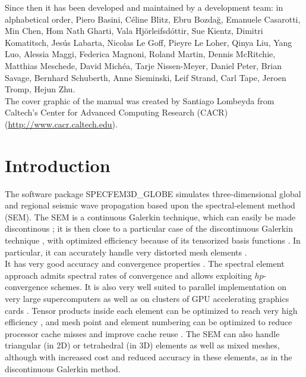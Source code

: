 \documentclass[oneside,english]{book}
\newcommand{\urlwithparentheses}[1]{(\url{#1})}
\newcommand{\toall}[1]{\textbf{*** All: #1 ***}}
\begin{document}
Since then it has been developed and maintained by a development team: in alphabetical order,
Piero Basini,
C\'eline Blitz,
Ebru Bozda\u{g},
Emanuele Casarotti,
Min Chen,
Hom Nath Gharti,
Vala Hj\"orleifsd\'ottir,
Sue Kientz,
Dimitri Komatitsch,
Jes\'us Labarta,
Nicolas Le Goff,
Pieyre Le Loher,
Qinya Liu,
Yang Luo,
Alessia Maggi,
Federica Magnoni,
Roland Martin,
Dennis McRitchie,
Matthias Meschede,
David Mich\'ea,
Tarje Nissen-Meyer,
Daniel Peter,
Brian Savage,
Bernhard Schuberth,
Anne Sieminski,
Leif Strand,
Carl Tape,
Jeroen Tromp,
Hejun Zhu.\\

The cover graphic of the manual was created
by Santiago Lombeyda from Caltech's Center for Advanced Computing Research (CACR) \urlwithparentheses{http://www.cacr.caltech.edu}.\\

\newpage{}

\tableofcontents{}

\chapter{Introduction}

The software package SPECFEM3D\_GLOBE simulates three-dimensional
global and regional seismic wave propagation based upon the spectral-element
method (SEM). The SEM is a continuous Galerkin technique, which can easily be made discontinous \citep{BeMaPa94,Ch00,KoWoHu02,ChCaVi03,LaWaBe05,Kop06,WiStBuGh10,AcKo11}; it is then close to a particular case of the discontinuous Galerkin technique \citep{ReHi73,Arn82,FaRi99,HuHuRa99,CoKaSh00,GiHeWa02,RiWh03,MoRi05,GrScSc06,AiMoMu06,BeLaPi06,DuKa06,DeSeWh08,PuAmKa09,WiStBuGh10,DeSe10,EtChViGl10}, with optimized efficiency because of its tensorized basis functions \citep{WiStBuGh10,AcKo11}.
In particular, it can accurately handle very distorted mesh elements \citep{OlSe11}.\\

It has very good accuracy and convergence properties \citep{MaPa89,SePr94,DeFiMu02,Coh02,DeSe07,SeOl08}.
The spectral element approach admits spectral rates of convergence and allows exploiting $hp$-convergence schemes.
It is also very well suited to parallel implementation on very large supercomputers \citep{KoTr02a,KoTsChTr03,TsKoChTr03,KoLaMi08a,CaKoLaTiMiLeSnTr08,KoViCh10} as well as on clusters of GPU accelerating graphics cards \citep{KoMiEr09,KoErGoMi10,Kom11}. Tensor products inside each element can be optimized to reach very high efficiency \citep{DeFiMu02}, and mesh point and element numbering can be optimized to reduce processor cache misses and improve cache reuse \citep{KoLaMi08a}. The SEM can also handle triangular (in 2D) or tetrahedral (in 3D) elements \citep{WinBoyd96,TaWi00,KoMaTrTaWi01,Coh02,MeViSa06} as well as mixed meshes, although with increased cost and reduced accuracy in these elements, as in the discontinuous Galerkin method.\\
\end{document}
